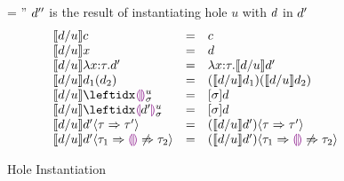 \begin{figure}[t]
\judgbox
  { = \dexp''}
  {$d''$ is the result of instantiating hole $u$ with $d$ in $d'$}
\[
\begin{array}{lcll}
\instantiate{\dexp}{u}{c}
&=&
c\\
{\instantiate{\dexp}{u}{x}}
&=&
\dexp\\
{\instantiate{\dexp}{u}{\halam{x}{\htau}{\dexp'}}}
&=&
{\halam{x}{\htau}{\instantiate{\dexp}{u}{\dexp'}}}\\
{\instantiate{\dexp}{u}{\dap{d_1}{d_2}}}
&=&
{\dapP{\instantiate{\dexp}{u}{d_1}}{\instantiate{\dexp}{u}{d_2}}}
\\
\instantiate{\dexp}{u}{\dehole{u}{\subst}{}}
&=&
[\subst]\dexp
\\
\instantiate{\dexp}{u}{\dhole{\dexp'}{u}{\subst}{}}
&=&
[\subst]\dexp
\\
\instantiate{\dexp}{u}{\dcasttwo{\dexp'}{\htau}{\htau'}}
&=&
\dcasttwo{(\instantiate{\dexp}{u}{\dexp'})}{\htau}{\htau'}
\\
\instantiate{\dexp}{u}{\dcastfail{\dexp'}{\htau_1}{\htau_2}}
&=&
\dcastfail{(\instantiate{\dexp}{u}{\dexp'})}{\htau_1}{\htau_2}
\end{array}
\]
\caption{Hole Instantiation}
\end{figure}
